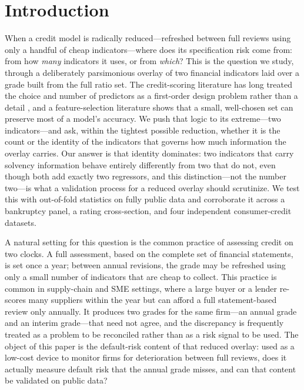\documentclass[pdflatex,sn-mathphys-ay]{sn-jnl}
\begin{document}


\maketitle

\section{Introduction}\label{sec:intro}

When a credit model is radically reduced---refreshed between full reviews using only a handful of
cheap indicators---where does its specification risk come from: from how \emph{many} indicators it uses,
or from \emph{which}? This is the question we study, through a deliberately parsimonious overlay of two
financial indicators laid over a grade built from the full ratio set. The credit-scoring literature has
long treated the choice and number of predictors as a first-order design problem rather than a detail
\citep{lessmann2015benchmarking,dumitrescu2022machine}, and a feature-selection literature shows that a
small, well-chosen set can preserve most of a model's accuracy. We push that logic to its extreme---two
indicators---and ask, within the tightest possible reduction, whether it is the count or the identity of
the indicators that governs how much information the overlay carries. Our answer is that identity
dominates: two indicators that carry solvency information behave entirely differently from two that do
not, even though both add exactly two regressors, and this distinction---not the number two---is what a
validation process for a reduced overlay should scrutinize. We test this with out-of-fold statistics on
fully public data and corroborate it across a bankruptcy panel, a rating cross-section, and four
independent consumer-credit datasets.

A natural setting for this question is the common practice of assessing credit on two clocks. A full
assessment, based on the complete set of financial statements, is set once a year; between annual
revisions, the grade may be refreshed using only a small number of indicators that are cheap to
collect. This practice is common in supply-chain and SME settings, where a large buyer or a lender
re-scores many suppliers within the year but can afford a full statement-based review only annually.
It produces two grades for the same firm---an annual grade and an interim grade---that need not
agree, and the discrepancy is frequently treated as a problem to be reconciled rather than as a risk
signal to be used. The object of this paper is the default-risk content of that reduced overlay:
used as a low-cost device to monitor firms for deterioration between full reviews, does it actually
measure default risk that the annual grade misses, and can that content be validated on public data?
\end{document}
